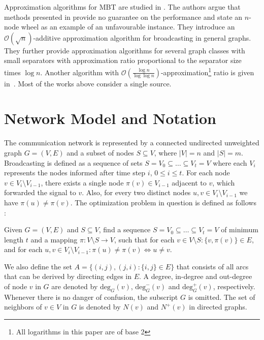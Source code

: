 Approximation algorithms for MBT are studied in \cite{kortsarz95}. 
The authors argue that methods presented in \cite{scheuermann84} provide no guarantee on the performance and state an $n$-node wheel as an example of an unfavourable instance.
They introduce an $\mathcal{O}(\sqrt{n})$-additive approximation algorithm for broadcasting in general graphs.
They further provide approximation algorithms for several graph classes with small separators with approximation ratio proportional to the separator size times $\log n$.
Another algorithm with $\mathcal{O}\left(\frac{\log n}{\log \log n}\right)$-approximation\footnote{All logarithms in this paper are of base 2} ratio is given in~\cite{elkin03}.
Most of the works above consider a single source.

\section{Network Model and Notation}

The communication network is represented by a connected undirected unweighted graph $G=(V,E)$ and a subset of nodes $S\subseteq V$, where $|V|=n$ and $|S|=m$. 
Broadcasting is defined as a sequence of sets $S=V_0\subseteq\dots\subseteq V_t = V$ where each $V_i$ represents the nodes informed after time step $i$, $0\leq i\leq t$.
For each node $v\in V_i\setminus V_{i-1}$, there exists a single node $\pi(v)\in V_{i-1}$ adjacent to $v$, which forwarded the signal to $v$.
Also, for every two distinct nodes $u,v\in V_i\setminus V_{i-1}$ we have $\pi(u)\neq \pi(v)$.
The optimization problem in question is defined as follows \cite{jansen95,middendorf93}:
\begin{problem}\label{prob:min}
Given $G=(V,E)$ and $S\subseteq V$, find a sequence $S=V_0\subseteq\dots\subseteq V_t=V$ of minimum length $t$ 
and a mapping $\pi:V\setminus S\to V$, such that for each $v\in V\setminus S:\{v,\pi(v)\}\in E$, and for each $u,v\in V_i\setminus V_{i-1}: \pi(u)\neq \pi(v)\Leftrightarrow u\neq v$.
\end{problem}
We also define the set $A=\{(i,j),(j,i):\{i,j\}\in E\}$ that consists of all arcs that can be derived by directing edges in $E$.
A degree, in-degree and out-degree of node $v$ in $G$ are denoted by $\text{deg}_G(v)$, $\text{deg}^-_G(v)$ and $\text{deg}^+_G(v)$, respectively.
Whenever there is no danger of confusion, the subscript $G$ is omitted.
The set of neighbors of $v\in V$ in $G$ is denoted by $N(v)$ and $N^+(v)$ in directed graphs.

